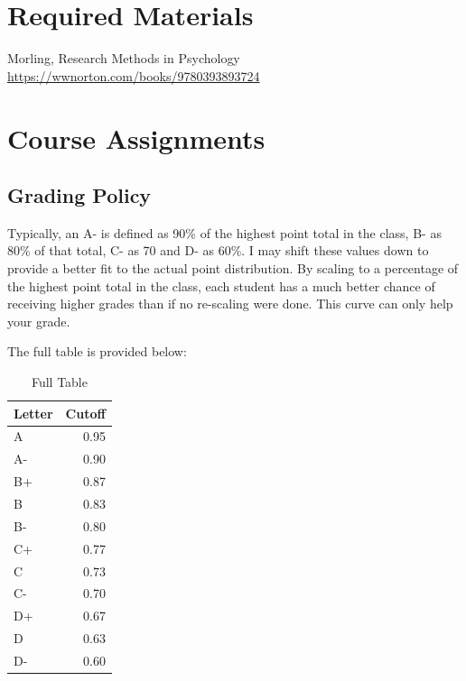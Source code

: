 \hypertarget{required-materials-1}{%
\section*{Required Materials}\label{required-materials-1}}


Morling, Research Methods in Psychology \url{https://wwnorton.com/books/9780393893724}

\hypertarget{course-assignments-1}{%
\section*{Course Assignments}\label{course-assignments-1}}


\hypertarget{grading-policy-1}{%
\subsection*{Grading Policy}\label{grading-policy-1}}


Typically, an A- is defined as 90\% of the highest point total in the class, B- as 80\% of that total, C- as 70 and D- as 60\%.
I may shift these values down to provide a better fit to the actual point distribution.
By scaling to a percentage of the highest point total in the class, each student has a much better chance of receiving higher grades than if no re-scaling were done.
This curve can only help your grade.

The full table is provided below:

\begin{table}

\caption{\label{tab:unnamed-chunk-3}Full Table}
\centering
\begin{tabular}[t]{l|r}
\hline
Letter & Cutoff\\
\hline
A & 0.95\\
\hline
A- & 0.90\\
\hline
B+ & 0.87\\
\hline
B & 0.83\\
\hline
B- & 0.80\\
\hline
C+ & 0.77\\
\hline
C & 0.73\\
\hline
C- & 0.70\\
\hline
D+ & 0.67\\
\hline
D & 0.63\\
\hline
D- & 0.60\\
\hline
\end{tabular}
\end{table}

